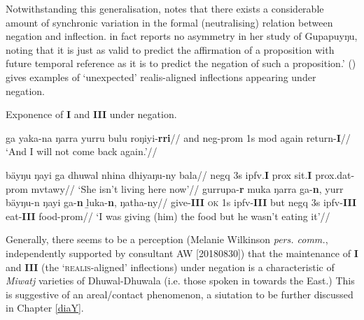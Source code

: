 \xe

Notwithstanding this generalisation, \citet[358\textit{ff}]{Wilkinson1991} notes that there exists a considerable amount of synchronic variation in the formal (neutralising) relation between negation and inflection.  in fact reports no asymmetry in her study of Gupapuyŋu, noting that it is just as valid to predict the affirmation of a proposition with future temporal reference as it is to predict the negation of such a proposition.' (\nextx) gives examples of `unexpected' realis-aligned inflections appearing under negation.

\pex Exponence of \textbf{I} and \textbf{III} under negation.


\a\begingl\gla ga yaka-na ŋarra yurru bulu roŋiyi-\textbf{rri}//
\glb and \gls{neg}-\gls{prom} 1s \gls{mod} again return-\textbf{I}//
\glft`And I will not come back again.'//
\endgl


\a\begingl \gla bäyŋu ŋayi ga dhuwal nhina dhiyaŋu-ny bala//
\glb \gls{negq} 3s \gls{ipfv}.\textbf{I} \gls{prox} sit.\textbf{I} \gls{prox}.\gls{dat}-\gls{prom} \gls{mvtawy}//
\glft`She isn't living here now'//\endgl
{}
\a\begingl \gla gurrupa-\textbf{r} muka ŋarra ga-\textbf{n}, yurr bäyŋu-n ŋayi ga-\textbf{n} ḻuka-\textbf{n}, ŋatha-ny//
\glb give-\textbf{III} \textsc{ok} 1s \gls{ipfv}-\textbf{III} but \gls{negq} 3s \gls{ipfv}-\textbf{III} eat-\textbf{III} food-\gls{prom}//
\glft`I was giving (him) the food but he wasn't eating it'//\endgl

\xe

Generally, there seems to be a perception (Melanie Wilkinson \textit{pers. comm.}, independently supported by consultant AW [20180830]) that the maintenance of \textbf{I} and \textbf{III} (the `\textsc{realis}-aligned' inflections) under negation is a characteristic of \textit{Miwatj} varieties of Dhuwal-Dhuwala (i.e. those spoken in towards the East.) This is suggestive of an areal/contact phenomenon, a siutation to be further discussed in Chapter \ref{diaY}.

